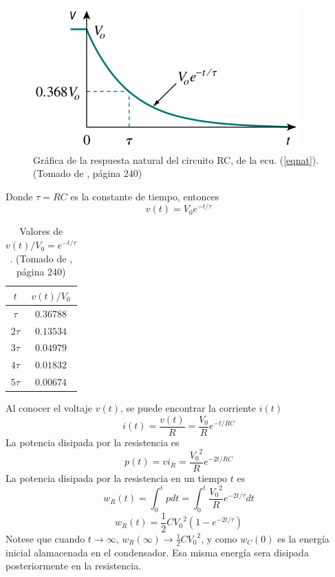\documentclass[twocolumn]{IEEEtran}
\begin{document}
\begin{figure}[H]
	\centering
		\includegraphics[scale=0.5]{respnat.png}
	\caption{Gráfica de la respuesta natural del circuito RC, de la ecu. (\ref{eqnat}). (Tomado de \cite{sadiku}, página 240)}
	\label{respnat}
\end{figure}
\noindent
Donde $\tau = RC$ es la constante de tiempo, entonces
\begin{equation}
 v(t) = V_{0}{e^{ - t/\tau}}
\label{ecu1}
\end{equation}

\begin{table}[H]
	\centering
\begin{tabular}[c]{|c|c|}\hline
$t$ & $v(t) / V_0$ \\ \hline
$\tau$ & $0.36788$ \\
$2\tau$ & $0.13534$ \\
$3\tau$ & $0.04979$ \\
$4\tau$ & $0.01832$ \\
$5\tau$ & $0.00674$ \\ \hline
\end{tabular}
	\caption{Valores de $v(t) / V_0 = e^{- t / \tau}$. (Tomado de \cite{sadiku}, página 240)}
	\label{tab1}
\end{table}
\noindent
Al conocer el voltaje $v(t)$, se puede encontrar la corriente $i(t)$
\begin{equation}
 i(t) = \frac{v(t)}{R} = \frac{V_0}{R} {e^{ - t/RC}}
\end{equation}
\noindent
La potencia disipada por la resistencia es
\begin{equation}
 p(t)= vi_R= \frac{{V_0}^{2}}{R} {e^{ - 2t/RC}}
\end{equation}
\noindent
La potencia disipada por la resistencia en un tiempo $t$ es
\begin{equation}
{w_R}(t) = \int_0^t {pdt}  = \int_0^t {\frac{{{V_0}^2}}{R}{e^{ - 2t/\tau }}} dt
\end{equation}
\begin{equation}
 {w_R}(t) = \frac{1}{2}C{V_0}^2\left( {1 - {e^{ - 2t/\tau }}} \right)
\end{equation}
\noindent
Notese que cuando $t \rightarrow \infty$, $w_R(\infty) \rightarrow \frac{1}{2}C{V_0}^2$, y como $w_C(0)$ es la energía inicial alamacenada en el condensador. Esa misma energía sera disipada posteriormente en la resistencia.
\end{document}
